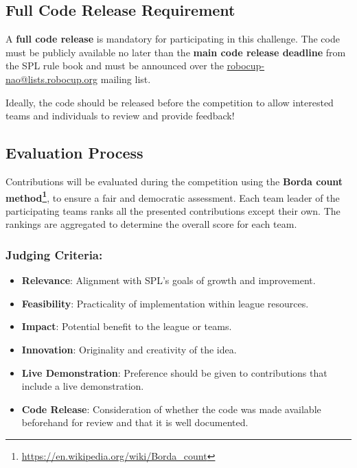 \subsection{Full Code Release Requirement}
A \textbf{full code release} is mandatory for participating in this challenge. The code must be publicly available no later than the \textbf{main code release deadline} from the SPL rule book and must be announced over the \url{robocup-nao@lists.robocup.org} mailing list.

Ideally, the code should be released before the competition to allow interested teams and individuals to review and provide feedback!

\subsection{Evaluation Process}
Contributions will be evaluated during the competition using the \textbf{Borda count method\footnote{\url{https://en.wikipedia.org/wiki/Borda_count}}}, to ensure a fair and democratic assessment. Each team leader of the participating teams ranks all the presented contributions except their own. The rankings are aggregated to determine the overall score for each team.

\subsubsection*{Judging Criteria:}
\begin{itemize}
    \item \textbf{Relevance}: Alignment with SPL’s goals of growth and improvement.
    \item \textbf{Feasibility}: Practicality of implementation within league resources.
    \item \textbf{Impact}: Potential benefit to the league or teams.
    \item \textbf{Innovation}: Originality and creativity of the idea.
    \item \textbf{Live Demonstration}: Preference should be given to contributions that include a live demonstration.
    \item \textbf{Code Release}: Consideration of whether the code was made available beforehand for review and that it is well documented.
\end{itemize}

